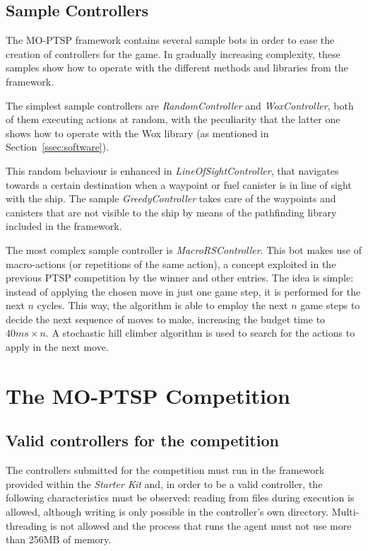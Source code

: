 \documentclass[conference]{IEEEtran}
\begin{document}
\subsection{Sample Controllers} \label{ssec:sample} 

The MO-PTSP framework contains several sample bots in order to ease the creation of controllers for the game. In gradually increasing complexity, these samples show how to operate with the different methods and libraries from the framework.

The simplest sample controllers are \textit{RandomController} and \textit{WoxController}, both of them executing actions at random, with the peculiarity that the latter one shows how to operate with the Wox library (as mentioned in Section~\ref{ssec:software}).

This random behaviour is enhanced in \textit{LineOfSightController}, that navigates towards a certain destination when a waypoint or fuel canister is in line of sight with the ship. The sample \textit{GreedyController} takes care of the waypoints and canisters that are not visible to the ship by means of the pathfinding library included in the framework.

The most complex sample controller is \textit{MacroRSController}. This bot makes use of macro-actions (or repetitions of the same action), a concept exploited in the previous PTSP competition by the winner and other entries. The idea is simple: instead of applying the chosen move in just one game step, it is performed for the next $n$ cycles. This way, the algorithm is able to employ the next $n$ game steps to decide the next sequence of moves to make, increasing the budget time to $40ms \times n$. A stochastic hill climber algorithm is used to search for the actions to apply in the next move.

\section{The MO-PTSP Competition} \label{sec:comp}

\subsection{Valid controllers for the competition}

The controllers submitted for the competition must run in the framework provided within the \textit{Starter Kit} and, in order to be a valid controller, the following characteristics must be observed: reading from files during execution is allowed, although writing is only possible in the controller's own directory. Multi-threading is not allowed and the process that runs the agent must not use more than 256MB of memory.
\end{document}
